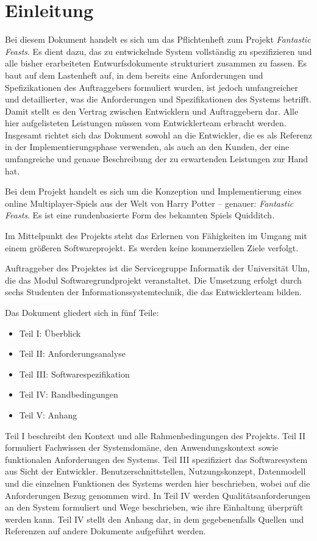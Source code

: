 \section{Einleitung}
Bei diesem Dokument handelt es sich um das Pflichtenheft zum Projekt \textit{Fantastic Feasts}. Es dient dazu, das zu entwickelnde System vollständig zu spezifizieren und alle bisher erarbeiteten Entwurfsdokumente strukturiert zusammen zu fassen. Es baut auf dem Lastenheft auf, in dem bereits eine Anforderungen und Spefizikationen des Auftraggebers formuliert wurden, ist jedoch umfangreicher und detaillierter, was die Anforderungen und Spezifikationen des Systems betrifft. Damit stellt es den Vertrag zwischen Entwicklern und Auftraggebern dar. Alle hier aufgelisteten Leistungen müssen vom Entwicklerteam erbracht werden. Insgesamt richtet sich das Dokument sowohl an die Entwickler, die es als Referenz in der Implementierungsphase verwenden, als auch an den Kunden, der eine umfangreiche und genaue Beschreibung der zu erwartenden Leistungen zur Hand hat.

Bei dem Projekt handelt es sich um die Konzeption und Implementierung eines online Multiplayer-Spiels aus der Welt von Harry Potter – genauer: \textit{Fantastic Feasts}. Es ist eine rundenbasierte Form des bekannten Spiels Quidditch.

Im Mittelpunkt des Projekts steht das Erlernen von Fähigkeiten im Umgang mit einem größeren Softwareprojekt. Es werden keine kommerziellen Ziele verfolgt.

Auftraggeber des Projektes ist die Servicegruppe Informatik der Universität Ulm, die das Modul Softwaregrundprojekt veranstaltet. Die Umsetzung erfolgt durch sechs Studenten der Informationssystemtechnik, die das Entwicklerteam bilden.

Das Dokument gliedert sich in fünf Teile:

\begin{itemize}
\item Teil I: Überblick
\item Teil II: Anforderungsanalyse
\item Teil III: Softwarespezifikation
\item Teil IV: Randbedingungen
\item Teil V: Anhang
\end{itemize}

Teil I beschreibt den Kontext und alle Rahmenbedingungen des Projekts. Teil II formuliert Fachwissen der Systemdomäne, den Anwendungskontext sowie funktionalen Anforderungen des Systems. Teil III spezifiziert das Softwaresystem aus Sicht der Entwickler. Benutzerschnittstellen, Nutzungskonzept, Datenmodell und die einzelnen Funktionen des Systems werden hier beschrieben, wobei auf die Anforderungen Bezug genommen wird. In Teil IV werden Qualitätsanforderungen an den System formuliert und Wege beschrieben, wie ihre Einhaltung überprüft werden kann. Teil IV stellt den Anhang dar, in dem gegebenenfalls Quellen und Referenzen auf andere Dokumente aufgeführt werden.


